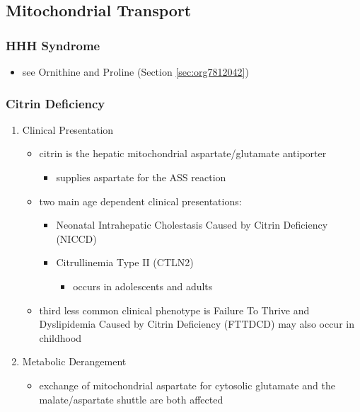 \documentclass[12pt]{scrartcl}
\begin{document}
\begin{center}
\begin{center}
\subsection{Mitochondrial Transport}
\label{sec:orgd5788e2}
\subsubsection{HHH Syndrome}
\label{sec:org91accfc}
\begin{itemize}
\item see Ornithine and Proline (Section \ref{sec:org7812042})
\end{itemize}
\subsubsection{Citrin Deficiency}
\label{sec:org1a871f7}
\begin{enumerate}
\item Clinical Presentation
\label{sec:org28fd815}
\begin{itemize}
\item citrin is the hepatic mitochondrial aspartate/glutamate antiporter
\begin{itemize}
\item supplies aspartate for the ASS reaction
\end{itemize}
\item two main age dependent clinical presentations:
\begin{itemize}
\item Neonatal Intrahepatic Cholestasis Caused by Citrin Deficiency (NICCD)
\item Citrullinemia Type II (CTLN2)
\begin{itemize}
\item occurs in adolescents and adults
\end{itemize}
\end{itemize}
\item third less common clinical phenotype is Failure To Thrive and
Dyslipidemia Caused by Citrin Deficiency (FTTDCD) may also occur in
childhood
\end{itemize}

\item Metabolic Derangement
\label{sec:org22686fa}
\begin{itemize}
\item exchange of mitochondrial aspartate for cytosolic glutamate and
the malate/aspartate shuttle are both affected
\end{itemize}


\end{enumerate}
\end{center}
\end{center}
\end{document}
